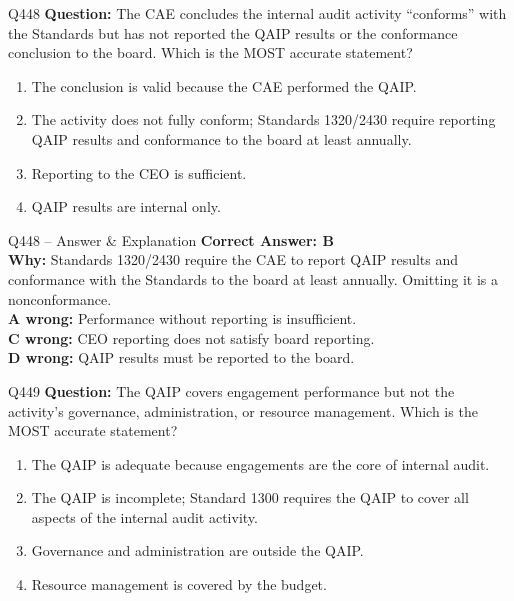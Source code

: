 \documentclass[aspectratio=169,10pt]{beamer}
\begin{document}
	\begin{frame}[t]{Q448}
		\small
		\textbf{Question:} The CAE concludes the internal audit activity ``conforms'' with the Standards but has not reported the QAIP results or the conformance conclusion to the board. Which is the MOST accurate statement?
		\begin{enumerate}[label=\Alph*.,itemsep=1pt,topsep=2pt]
			\item The conclusion is valid because the CAE performed the QAIP.
			\item The activity does not fully conform; Standards 1320/2430 require reporting QAIP results and conformance to the board at least annually.
			\item Reporting to the CEO is sufficient.
			\item QAIP results are internal only.
		\end{enumerate}
	\end{frame}
	
	\begin{frame}[t]{Q448 -- Answer \& Explanation}
		\small
		\textbf{Correct Answer: B} \\[4pt]
		\textbf{Why:} Standards 1320/2430 require the CAE to report QAIP results and conformance with the Standards to the board at least annually. Omitting it is a nonconformance. \\[4pt]
		\textbf{A wrong:} Performance without reporting is insufficient. \\[2pt]
		\textbf{C wrong:} CEO reporting does not satisfy board reporting. \\[2pt]
		\textbf{D wrong:} QAIP results must be reported to the board.
	\end{frame}
	
	\begin{frame}[t]{Q449}
		\small
		\textbf{Question:} The QAIP covers engagement performance but not the activity's governance, administration, or resource management. Which is the MOST accurate statement?
		\begin{enumerate}[label=\Alph*.,itemsep=1pt,topsep=2pt]
			\item The QAIP is adequate because engagements are the core of internal audit.
			\item The QAIP is incomplete; Standard 1300 requires the QAIP to cover all aspects of the internal audit activity.
			\item Governance and administration are outside the QAIP.
			\item Resource management is covered by the budget.
		\end{enumerate}
	\end{frame}
	
\end{document}

